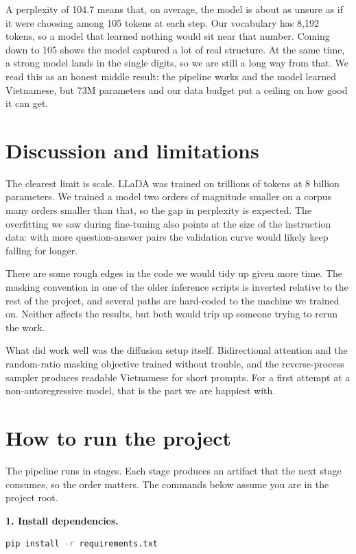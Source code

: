 \documentclass{llncs}
\begin{document}
A perplexity of 104.7 means that, on average, the model is about as unsure as if it were choosing
among 105 tokens at each step. Our vocabulary has 8{,}192 tokens, so a model that learned nothing
would sit near that number. Coming down to 105 shows the model captured a lot of real structure.
At the same time, a strong model lands in the single digits, so we are still a long way from that.
We read this as an honest middle result: the pipeline works and the model learned Vietnamese, but
73M parameters and our data budget put a ceiling on how good it can get.

\section{Discussion and limitations}

The clearest limit is scale. LLaDA was trained on trillions of tokens at 8 billion parameters.
We trained a model two orders of magnitude smaller on a corpus many orders smaller than that, so
the gap in perplexity is expected. The overfitting we saw during fine-tuning also points at the
size of the instruction data: with more question-answer pairs the validation curve would likely
keep falling for longer.

There are some rough edges in the code we would tidy up given more time. The masking convention in
one of the older inference scripts is inverted relative to the rest of the project, and several
paths are hard-coded to the machine we trained on. Neither affects the results, but both would trip
up someone trying to rerun the work.

What did work well was the diffusion setup itself. Bidirectional attention and the random-ratio
masking objective trained without trouble, and the reverse-process sampler produces readable
Vietnamese for short prompts. For a first attempt at a non-autoregressive model, that is the part
we are happiest with.

\section{How to run the project}

The pipeline runs in stages. Each stage produces an artifact that the next stage consumes, so the
order matters. The commands below assume you are in the project root.

\medskip
\noindent\textbf{1. Install dependencies.}
\begin{lstlisting}[language=bash]
pip install -r requirements.txt
\end{lstlisting}
\end{document}
